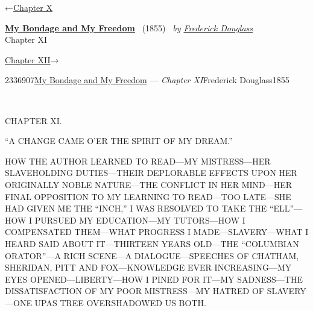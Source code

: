 \hypertarget{headerContainer}{}
\hypertarget{navigationHeader}{}
\protect\hypertarget{headerprevious}{}{←\href{/wiki/My_Bondage_and_My_Freedom_(1855)/Chapter_X}{Chapter
X}}

\textbf{\protect\hypertarget{header_title_text}{}{\href{/wiki/My_Bondage_and_My_Freedom_(1855)}{My
Bondage and My Freedom}}} ~(1855)~ \emph{by
\href{/wiki/Author:Frederick_Douglass}{\protect\hypertarget{header_author_text}{}{{Frederick
Douglass}}}}\\
\protect\hypertarget{header_section_text}{}{Chapter XI}

\protect\hypertarget{headernext}{}{\href{/wiki/My_Bondage_and_My_Freedom_(1855)/Chapter_XII}{Chapter
XII}→}

\hypertarget{navigationNotes}{}

\hypertarget{ws-data}{}
\protect\hypertarget{ws-article-id}{}{2336907}\protect\hypertarget{ws-title}{}{\href{/wiki/My_Bondage_and_My_Freedom_(1855)}{My
Bondage and My Freedom} --- \emph{Chapter
XI}}\protect\hypertarget{ws-author}{}{Frederick
Douglass}\protect\hypertarget{ws-year}{}{1855}

{\protect\hypertarget{151}{}{}}

~

{CHAPTER XI.}

``A CHANGE CAME O'ER THE SPIRIT OF MY DREAM.''

{HOW THE AUTHOR LEARNED TO READ---MY MISTRESS---HER SLAVEHOLDING
DUTIES---THEIR DEPLORABLE EFFECTS UPON HER ORIGINALLY NOBLE NATURE---THE
CONFLICT IN HER MIND---HER FINAL OPPOSITION TO MY LEARNING TO READ---TOO
LATE---SHE HAD GIVEN ME THE ``INCH,'' I WAS RESOLVED TO TAKE THE
``ELL''---HOW I PURSUED MY EDUCATION---MY TUTORS---HOW I COMPENSATED
THEM---WHAT PROGRESS I MADE---SLAVERY---WHAT I HEARD SAID ABOUT
IT---THIRTEEN YEARS OLD---THE ``COLUMBIAN ORATOR''---A RICH SCENE---A
DIALOGUE---SPEECHES OF CHATHAM, SHERIDAN, PITT AND FOX---KNOWLEDGE EVER
INCREASING---MY EYES OPENED---LIBERTY---HOW I PINED FOR IT---MY
SADNESS---THE DISSATISFACTION OF MY POOR MISTRESS---MY HATRED OF
SLAVERY---ONE UPAS TREE OVERSHADOWED US BOTH.}

